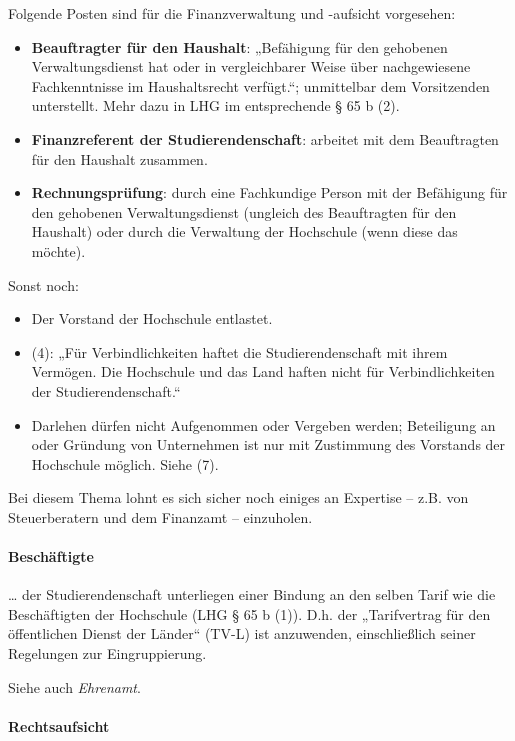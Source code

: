 \documentclass[
10pt,
a4paper,
twoside,								%
titlepage=false,							%
draft=false								%
]{scrartcl}
\begin{document}
Folgende Posten sind für die Finanzverwaltung und -aufsicht vorgesehen:
\begin{itemize}
	\item \textbf{Beauftragter für den Haushalt}: „Befähigung für den gehobenen Verwaltungsdienst hat oder in vergleichbarer Weise über nachgewiesene Fachkenntnisse im Haushaltsrecht verfügt.“; unmittelbar dem Vorsitzenden unterstellt. Mehr dazu in LHG im entsprechende § 65 b (2).
	\item \textbf{Finanzreferent der Studierendenschaft}: arbeitet mit dem Beauftragten für den Haushalt zusammen. 
	\item \textbf{Rechnungsprüfung}: durch eine Fachkundige Person mit der Befähigung für den gehobenen Verwaltungsdienst (ungleich des Beauftragten für den Haushalt) oder durch die Verwaltung der Hochschule (wenn diese das möchte).
\end{itemize}

Sonst noch:
\begin{itemize}
	\item Der Vorstand der Hochschule entlastet.
	\item (4): „Für Verbindlichkeiten haftet die Studierendenschaft mit ihrem Vermögen. Die Hochschule und das Land haften nicht für Verbindlichkeiten der Studierendenschaft.“
	\item Darlehen dürfen nicht Aufgenommen oder Vergeben werden; Beteiligung an oder Gründung von Unternehmen ist nur mit Zustimmung des Vorstands der Hochschule möglich. Siehe (7).
\end{itemize}

Bei diesem Thema lohnt es sich sicher noch einiges an Expertise – z.B. von Steuerberatern und dem Finanzamt – einzuholen.


\paragraph{Beschäftigte}

… der Studierendenschaft unterliegen einer Bindung an den selben Tarif wie die Beschäftigten der Hochschule (LHG § 65 b (1)). D.h. der „Tarifvertrag für den öffentlichen Dienst der Länder“ (TV-L) ist anzuwenden, einschließlich seiner Regelungen zur Eingruppierung.

Siehe auch \emph{Ehrenamt}.


\paragraph{Rechtsaufsicht}
\end{document}
